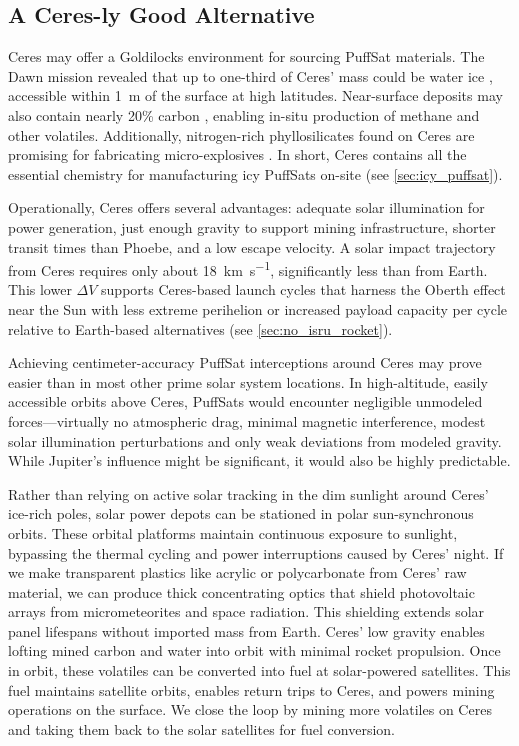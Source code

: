 \documentclass{article}
\begin{document}
\subsection{A Ceres-ly Good Alternative}\label{sec:ceresly_good}
Ceres may offer a Goldilocks environment for sourcing PuffSat materials. The Dawn mission revealed that up to one-third of Ceres' mass could be water ice \cite{ceres_ice}, accessible within \SI{1}{\meter} of the surface at high latitudes. Near-surface deposits may also contain nearly 20\% carbon \cite{ceres_carbon_nitrogen}, enabling in-situ production of methane and other volatiles. Additionally, nitrogen-rich phyllosilicates found on Ceres are promising for fabricating micro-explosives \cite{ceres_carbon_nitrogen}. In short, Ceres contains all the essential chemistry for manufacturing icy PuffSats on-site (see \autoref{sec:icy_puffsat}).

Operationally, Ceres offers several advantages: adequate solar illumination for power generation, just enough gravity to support mining infrastructure, shorter transit times than Phoebe, and a low escape velocity. A solar impact trajectory from Ceres requires only about \SI{18}{\kilo\meter\per\second}, significantly less than from Earth. This lower $\Delta V$ supports Ceres-based launch cycles that harness the Oberth effect near the Sun with less extreme perihelion or increased payload capacity per cycle relative to Earth-based alternatives (see \autoref{sec:no_isru_rocket}).

Achieving centimeter-accuracy PuffSat interceptions around Ceres may prove easier than in most other prime solar system locations. In high-altitude, easily accessible orbits above Ceres, PuffSats would encounter negligible unmodeled forces—virtually no atmospheric drag, minimal magnetic interference, modest solar illumination perturbations and only weak deviations from modeled gravity. While Jupiter's influence might be significant, it would also be highly predictable. 

Rather than relying on active solar tracking in the dim sunlight around Ceres' ice-rich poles, solar power depots can be stationed in polar sun-synchronous orbits. These orbital platforms maintain continuous exposure to sunlight, bypassing the thermal cycling and power interruptions caused by Ceres’ night. If we make transparent plastics like acrylic or polycarbonate from Ceres' raw material, we can produce thick concentrating optics that shield photovoltaic arrays from micrometeorites and space radiation.  This shielding extends solar panel lifespans without imported mass from Earth. Ceres’ low gravity enables lofting mined carbon and water into orbit with minimal rocket propulsion. Once in orbit, these volatiles can be converted into fuel at solar-powered satellites.  This fuel maintains satellite orbits, enables return trips to Ceres, and powers mining operations on the surface.   We close the loop by mining more volatiles on Ceres and taking them back to the solar satellites for fuel conversion. 
\end{document}
